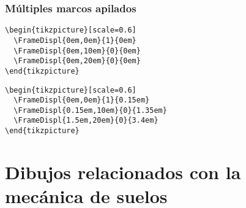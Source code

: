 \documentclass[11pt,letterpaper,oneside]{book}
\begin{document}
\subsection{Múltiples marcos apilados}

\begin{figure}[!htp]
  \centering
  \qquad

  \label{fig:rigi1}
\end{figure}

\begin{lstlisting}[firstnumber=1, title=Dibujo izquierdo]
\begin{tikzpicture}[scale=0.6]
  \FrameDispl{0em,0em}{1}{0em}
  \FrameDispl{0em,10em}{0}{0em}
  \FrameDispl{0em,20em}{0}{0em}
\end{tikzpicture}
\end{lstlisting}

\begin{lstlisting}[firstnumber=1, title=Dibujo derecho]
\begin{tikzpicture}[scale=0.6]
  \FrameDispl{0em,0em}{1}{0.15em}
  \FrameDispl{0.15em,10em}{0}{1.35em}
  \FrameDispl{1.5em,20em}{0}{3.4em}
\end{tikzpicture}
\end{lstlisting}


\chapter{Dibujos relacionados con la mecánica de suelos}
\end{document}
